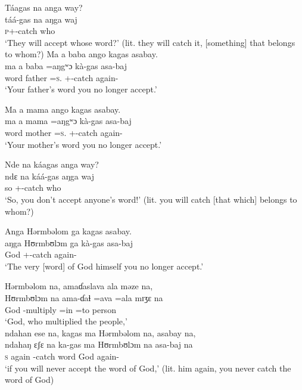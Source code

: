 \ea Táagas  na  anga  way?\\
 \gll táá-gas     na   aŋga   waj\\
 \textsc{p}+{\POT}-catch  {\PSP}  {\POSS}  who\\
 \glt ‘They will accept whose word?’ (lit. they will catch it, [something] that belongs to whom?)
 \z
\clearpage
\ea  Ma   a  baba  ango  kagas  asabay.\\
 \gll ma     a  baba   =aŋgʷɔ     kà-gas     asa-baj \\
 word  {\GEN}  father  =\textsc{s}.{\POSS}  {\twoS}+{\PFV}-catch  again-{\NEG}  \\
 \glt ‘Your father’s word you no longer accept.’
\z

\ea  Ma   a  mama  ango  kagas  asabay.\\
 \gll ma     a  mama   =aŋgʷɔ    kà-gas     asa-baj\\
 word  {\GEN}  mother  =\textsc{s}.{\POSS}  {\twoS}+{\PFV}-catch  again-{\NEG}\\
 \glt ‘Your mother’s word you no longer accept.’
 \z

\ea Nde na  káagas  anga  way?\\
 \gll ndɛ  na   káá-gas       aŋga   waj\\
 so  {\PSP}  {\twoS}+{\POT}-catch    {\POSS}  who\\
 \glt ‘So, you don’t accept anyone’s word!’ (lit. you will catch [that which] belongs to whom?)
 \z

\ea Anga  Hərmbəlom  ga  kagas  asabay. \\
 \gll aŋga   Hʊrmbʊlɔm   ga     kà-gas     asa-baj\\
 {\POSS}  God    {\ADJ}    {\twoS}+{\PFV}-catch  again-{\NEG}\\
 \glt ‘The very [word] of God himself you no longer accept.’
 \z

\ea Hərmbəlom  na,  amaɗaslava  ala  məze   na,\\
 \gll Hʊrmbʊlɔm  na  ama-ɗaɬ    =ava  =ala  mɪʒɛ  na\\
 God    {\PSP}    {\DEP}-multiply  =in  =to   person   {\PSP}     \\
 \glt ‘God, who multiplied the people,’\\
 
 \medskip
  ndahan  ese  na,  kagas  ma  Hərmbəlom  na,  asabay  na,  \\
 \gll ndahaŋ  ɛʃɛ  na  ka-gas      ma  Hʊrmbʊlɔm  na       asa-baj         na\\
 \textsc{s}     again    {\PSP}    {\twoS}-catch    word     God          {\PSP}  again-{\NEG}  {\PSP} \\
 \glt ‘if you will never accept the word of God,’ (lit. him again, you never catch the word of God)\\
 
